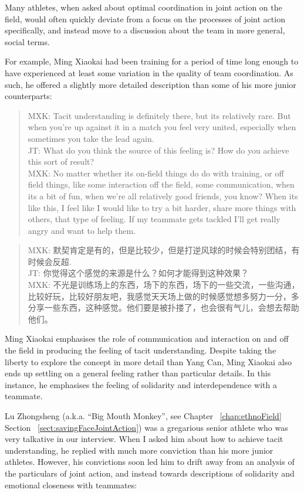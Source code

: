 \begin{CJK}{UTF8}{gbsn}
Many athletes, when asked about optimal coordination in joint action on the field, would often quickly deviate from a focus on the processes of joint action specifically, and instead move to a discussion about the team in more general, social terms.

For example, Ming Xiaokai had been training for a period of time long enough to have experienced at least some variation in the quality of team coordination.  As such, he offered a slightly more detailed description than some of his more junior counterparts:

    \begin{quote}
        MXK: Tacit understanding is definitely there, but its relatively rare. But when you’re up against it in a match you feel very united, especially when sometimes you take the lead again. \\
        JT: What do you think the source of this feeling is?  How do you achieve this sort of result? \\
        MXK: No matter whether its on-field things do do with training, or off field things, like some interaction off the field, some communication, when its a bit of fun, when we're all relatively good friends, you know?  When its like this, I feel like I would like to try a bit harder, share more things with others, that type of feeling.  If my teammate gets tackled I'll get really angry and want to help them.
    \end{quote}

    \begin{quote}
        MXK: 默契肯定是有的，但是比较少，但是打逆风球的时候会特别团结，有时候会反超. \\
        JT: 你觉得这个感觉的来源是什么？如何才能得到这种效果？\\
        MXK: 不光是训练场上的东西，场下的东西，场下的一些交流，一些沟通，比较好玩，比较好朋友吧，我感觉天天场上做的时候感觉想多努力一分，多分享一些东西，这种感觉。他们要是被扑搂了，也会很有气儿，会想去帮助他们。 
    \end{quote}

Ming Xiaokai emphasises the role of communication and interaction on and off the field in producing the feeling of tacit understanding.  Despite taking the liberty to explore the concept in more detail than Yang Can, Ming Xiaokai also ends up settling on a general feeling rather than particular details.  In this instance, he emphasises the feeling of solidarity and interdependence with a teammate.

Lu Zhongsheng (a.k.a. ``Big Mouth Monkey'', see Chapter ~\ref{chap:ethnoField} Section ~\ref{sect:savingFaceJointAction}) was a gregarious senior athlete who was very talkative in our interview.  When I asked him about how to achieve tacit understanding, he replied with much more conviction than his more junior athletes.  However, his convictions soon led him to drift away from an analysis of the particulars of joint action, and instead towards descriptions of solidarity and emotional closeness with teammates:


\end{CJK}
